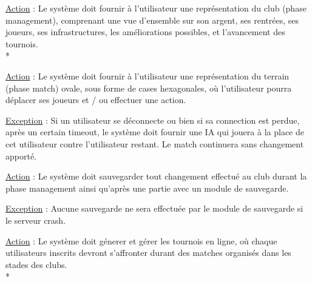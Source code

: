 \documentclass[a4paper]{article}
\begin{document}
\begin{description}[style=nextline]
\item[Représenter phase management :]
\begin{description}[leftmargin=*] %
\item \underline{Action} : Le système doit fournir à l'utilisateur une représentation du \gls{club} (phase management), comprenant une vue d'ensemble sur son argent, ses rentrées, ses joueurs, ses infrastructures, les améliorations possibles, et l'avancement des tournois.\\*
\end{description} %

\item[Représenter phase match :]
\begin{description}[leftmargin=*] %
\item \underline{Action} : Le système doit fournir à l'utilisateur une représentation du terrain (phase match) ovale, sous forme de cases hexagonales, où l'utilisateur pourra déplacer ses joueurs et / ou effectuer une action.
\item \underline{Exception} : Si un utilisateur se déconnecte ou bien si sa connection est perdue, après un certain timeout, le système doit fournir une IA qui jouera à la place de cet utilisateur contre l'utilisateur restant. Le match continuera sans changement apporté.
\end{description} %

\item[Sauvegarder :]
\begin{description}[leftmargin=*] %
\item \underline{Action} : Le système doit sauvegarder tout changement effectué au \gls{club} durant la phase management ainsi qu'après une partie avec un module de sauvegarde.
\item \underline{Exception} : Aucune sauvegarde ne sera effectuée par le module de sauvegarde si le serveur crash.
\end{description} %

\item[Gérer les tournois :]
\begin{description}[leftmargin=*] %
\item \underline{Action} : Le système doit génerer et gérer les tournois en ligne, où chaque utilisateurs inscrits devront s'affronter durant des matches organisés dans les stades des clubs.\\*
\end{description} %

\end{description}
\end{document}
